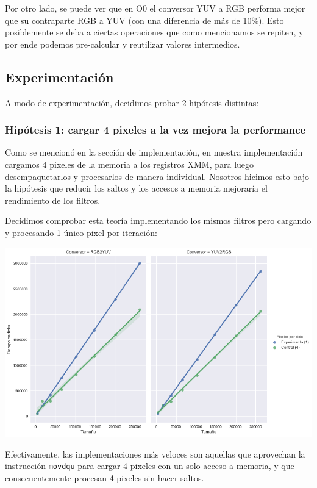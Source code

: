 Por otro lado, se puede ver que en O0 el conversor YUV a RGB performa mejor que su contraparte RGB a YUV (con una diferencia de más de 10\%). Esto posiblemente se deba a ciertas operaciones que como mencionamos se repiten, y por ende podemos pre-calcular y reutilizar valores intermedios.

\subsection{Experimentación}

A modo de experimentación, decidimos probar 2 hipótesis distintas:

\subsubsection*{Hipótesis 1: cargar 4 pixeles a la vez mejora la performance}

Como se mencionó en la sección de implementación, en nuestra implementación cargamos 4 pixeles de la memoria a los registros XMM, para luego desempaquetarlos y procesarlos de manera individual. Nosotros hicimos esto bajo la hipótesis que reducir los saltos y los accesos a memoria mejoraría el rendimiento de los filtros.

Decidimos comprobar esta teoría implementando los mismos filtros pero cargando y procesando 1 único pixel por iteración:

\begin{center}
	\includegraphics[scale=0.5]{img/conversores_1pixel.png}
\end{center}

Efectivamente, las implementaciones más veloces son aquellas que aprovechan la instrucción \texttt{movdqu} para cargar 4 pixeles con un solo acceso a memoria, y que consecuentemente procesan 4 pixeles sin hacer saltos.

